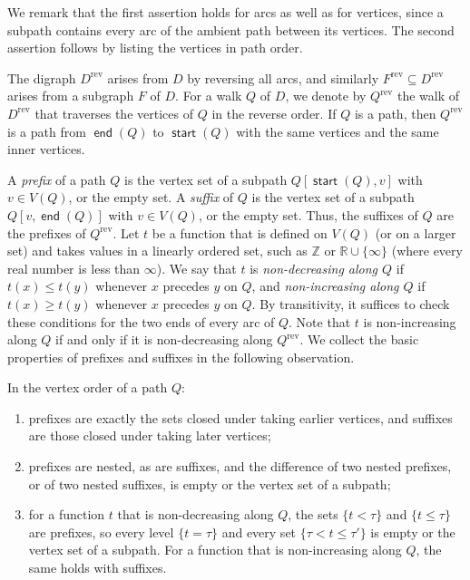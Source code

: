 \documentclass[fontsize=12pt,leading=14pt]{fullpaper}
\DeclareMathOperator{\st}{\mathsf{start}}
\DeclareMathOperator{\en}{\mathsf{end}}
\newcommand{\rev}{\mathrm{rev}}
\begin{document}
We remark that the first assertion holds for arcs as well as for vertices, since a subpath contains every arc of the ambient path between its vertices.
The second assertion follows by listing the vertices in path order.

The digraph $D^\rev$ arises from $D$ by reversing all arcs, and similarly $F^\rev\subseteq D^\rev$ arises from a subgraph $F$ of $D$.
For a walk $Q$ of $D$, we denote by $Q^\rev$ the walk of $D^\rev$ that traverses the vertices of $Q$ in the reverse order.
If $Q$ is a path, then $Q^\rev$ is a path from $\en(Q)$ to $\st(Q)$ with the same vertices and the same inner vertices.

A \emph{prefix} of a path $Q$ is the vertex set of a subpath $Q[\st(Q),v]$ with $v\in V(Q)$, or the empty set.
A \emph{suffix} of $Q$ is the vertex set of a subpath $Q[v,\en(Q)]$ with $v\in V(Q)$, or the empty set.
Thus, the suffixes of $Q$ are the prefixes of $Q^\rev$.
Let $t$ be a function that is defined on $V(Q)$ (or on a larger set) and takes values in a linearly ordered set, such as $\mathbb Z$ or $\mathbb R\cup\{\infty\}$ (where every real number is less than $\infty$).
We say that $t$ is \emph{non-decreasing along $Q$} if $t(x)\le t(y)$ whenever $x$ precedes $y$ on $Q$, and \emph{non-increasing along $Q$} if $t(x)\ge t(y)$ whenever $x$ precedes $y$ on $Q$.
By transitivity, it suffices to check these conditions for the two ends of every arc of $Q$.
Note that $t$ is non-increasing along $Q$ if and only if it is non-decreasing along $Q^\rev$.
We collect the basic properties of prefixes and suffixes in the following observation.

\begin{observation}\label{obs:prefix}
  In the vertex order of a path $Q$:
  \begin{enumerate}[label=\textnormal{(\roman*)}]
    \item\label{item:prefix-char} prefixes are exactly the sets closed under taking earlier vertices, and suffixes are those closed under taking later vertices;
    \item\label{item:prefix-nested} prefixes are nested, as are suffixes, and the difference of two nested prefixes, or of two nested suffixes, is empty or the vertex set of a subpath;
    \item\label{item:prefix-monotone} for a function $t$ that is non-decreasing along $Q$, the sets $\{t<\tau\}$ and $\{t\le\tau\}$ are prefixes, so every level $\{t=\tau\}$ and every set $\{\tau<t\le\tau'\}$ is empty or the vertex set of a subpath.
      For a function that is non-increasing along $Q$, the same holds with suffixes.
  \end{enumerate}
\end{observation}
\end{document}
